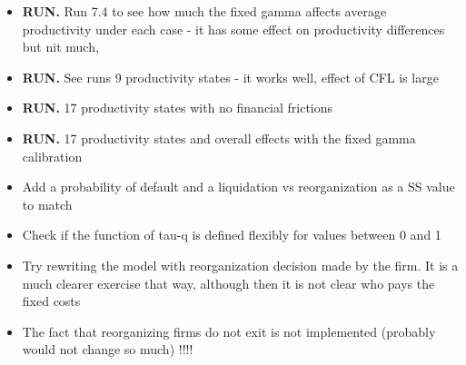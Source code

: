 \documentclass[12pt]{article}
\begin{document}
\begin{itemize}
    \item \textbf{RUN.} Run 7.4 to see how much the fixed gamma affects average productivity under each case - it has some effect on productivity differences but nit much, \checkmark
    \item \textbf{RUN.} See runs 9 productivity states - it works well, effect of CFL is large \checkmark
    \item \textbf{RUN.} 17 productivity states with no financial frictions \checkmark
    \item \textbf{RUN.} 17 productivity states and overall effects with the fixed gamma calibration \checkmark
    \item Add a probability of default and a liquidation vs reorganization as a SS value to match
    \item Check if the function of tau-q is defined flexibly for values between 0 and 1 \checkmark
    \item Try rewriting the model with reorganization decision made by the firm. It is a much clearer exercise that way, although then it is not clear who pays the fixed costs
    \item The fact that reorganizing firms do not exit is not implemented (probably would not change so much) !!!!
\end{itemize} \normalsize
\newpage
\end{document}
